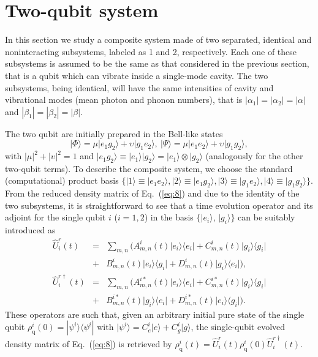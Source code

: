 \documentclass[twocolumn,3p,times]{elsarticle}
\newcommand{\bra}[1]{\langle#1|}
\newcommand{\ket}[1]{|#1\rangle}
\begin{document}
\section{Two-qubit system }\label{sec3}
In this section we study a composite system made of two separated, identical and noninteracting subsystems, labeled as 1 and 2, respectively. Each one of these subsystems is assumed to be the same as that considered in the previous section, that is a qubit which can vibrate inside a single-mode cavity. The two subsystems, being identical, will have the same intensities of cavity and vibrational modes (mean photon and phonon numbers), that is $|\alpha_1|=|\alpha_2|=|\alpha|$ and $|\beta_1|=|\beta_2|=|\beta|$. 

The two qubit are initially prepared in the Bell-like states
\begin{equation}
\label{eq:16}
\lvert\Phi\rangle = \mu\lvert e_{1}g_{2}\rangle+\upsilon\lvert g_{1}e_{2}\rangle, \
\lvert\Psi\rangle = \mu\lvert e_{1}e_{2}\rangle+\upsilon\lvert g_{1}g_{2}\rangle,
\end{equation}
with $|\mu|^2+|\upsilon|^2=1$ and $\lvert e_{1}g_{2}\rangle \equiv \ket{e_1}\ket{g_2}=\ket{e_1}\otimes\ket{g_2}$ (analogously for the other two-qubit terms).
To describe the composite system, we choose the standard (computational) product basis $\{\lvert 1\rangle\equiv\lvert e_{1}e_{2}\rangle, \lvert 2\rangle\equiv\lvert e_{1}g_{2}\rangle, \lvert 3\rangle\equiv\lvert g_{1}e_{2}\rangle, \lvert 4\rangle\equiv\lvert g_{1}g_{2}\rangle\}$.                   
From the reduced density matrix of Eq.~(\ref{eq:8}) and due to the identity of the two subsystems, it is straightforward to see that a time evolution operator and its adjoint for the single qubit $i$ ($i=1, 2$) in the basis $\{\lvert e_{i}\rangle$, 
$\lvert g_{i}\rangle\}$ can be suitably introduced as
\begin{eqnarray}
\label{eq:17}
\hat{U}_{i}^{r}(t)&=&\sum_{m,n}\big(A_{m,n}^{i}(t)\lvert e_{i}\rangle\langle e_{i}\rvert + C_{m,n}^{i}(t)\lvert g_{i}\rangle\langle g_{i}\rvert \nonumber \\
&+& B_{m,n}^{i}(t)\lvert e_{i}\rangle\langle g_{i}\rvert + D_{m,n}^{i}(t)\lvert g_{i}\rangle\langle e_{i}\rvert\big),\nonumber\\
\hat{U}_{i}^{r\dagger}(t)&=&\sum_{m,n}\big(A_{m,n}^{i\ast}(t)\lvert e_{i}\rangle\langle e_{i}\rvert + C_{m,n}^{i\ast}(t)\lvert g_{i}\rangle\langle g_{i}\rvert \nonumber \\
&+& B_{m,n}^{i\ast}(t)\lvert g_{i}\rangle\langle e_{i}\rvert + D_{m,n}^{i\ast}(t)\lvert e_{i}\rangle\langle g_{i}\rvert\big).
\end{eqnarray}
These operators are such that, given an arbitrary initial pure state of the single qubit $\rho_\mathrm{q}^i(0)=\ket{\psi^i}\bra{\psi^i}$ with $\ket{\psi^i}=C_{e}^i\lvert e\rangle+C_{g}^i\lvert g\rangle$, the single-qubit evolved density matrix of Eq.~(\ref{eq:8}) is retrieved by $\rho_\mathrm{q}^i(t)=\hat U_{i}^{r}(t)\rho_\mathrm{q}^i(0)\hat U_{i}^{r\dagger}(t)$.
 
\end{document}
